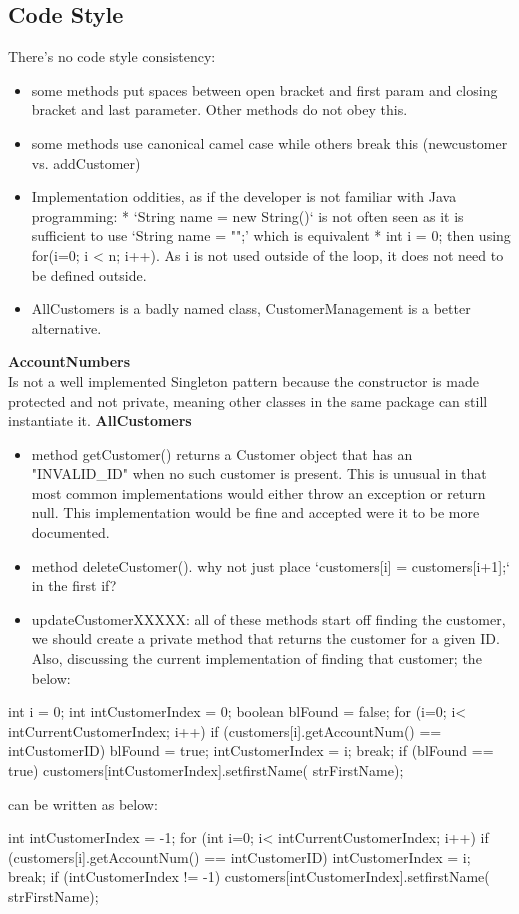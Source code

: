 \subsection{Code Style}
There's no code style consistency: 
\begin{itemize}
    \item some methods put spaces between open bracket and first param and closing bracket and last parameter. Other methods do not obey this. 
    \item some methods use canonical camel case while others break this (newcustomer vs. addCustomer)
    \item Implementation oddities, as if the developer is not familiar with Java programming: 
        * `String name = new String()` is not often seen as it is sufficient to use `String name = "";' which is equivalent
        * int i = 0; then using for(i=0; i < n; i++). As i is not used outside of the loop, it does not need to be defined outside. 
    \item AllCustomers is a badly named class, CustomerManagement is a better alternative. 
\end{itemize}
\textbf{AccountNumbers\\}
Is not a well implemented Singleton pattern because the constructor is made protected and not private, meaning other classes in the same package can still instantiate it.
\textbf{AllCustomers}
\begin{itemize}
    \item method getCustomer() returns a Customer object that has an "INVALID\_ID" when no such customer is present. This is unusual in that most common implementations would either throw an exception or return null. This implementation would be fine and accepted were it to be more documented. 

    \item method deleteCustomer(). why not just place `customers[i] = customers[i+1];` in the first if? 

    \item updateCustomerXXXXX: all of these methods start off finding the customer, we should create a private method that returns the customer for a given ID. Also, discussing the current implementation of finding that customer; the below: 
\end{itemize}

\begin{javacode}
int i = 0;
int intCustomerIndex = 0;
boolean blFound = false;
for (i=0; i< intCurrentCustomerIndex; i++) {
    if (customers[i].getAccountNum() == intCustomerID) {
        blFound = true;
        intCustomerIndex = i;
        break;
    }
}
if (blFound == true) {
    customers[intCustomerIndex].setfirstName( strFirstName);
}
\end{javacode}
can be written as below: 
\begin{javacode}
int intCustomerIndex = -1;
for (int i=0; i< intCurrentCustomerIndex; i++) {
    if (customers[i].getAccountNum() == intCustomerID) {
        intCustomerIndex = i;
        break;
    }
}
if (intCustomerIndex != -1) {
    customers[intCustomerIndex].setfirstName( strFirstName);
}
\end{javacode}

